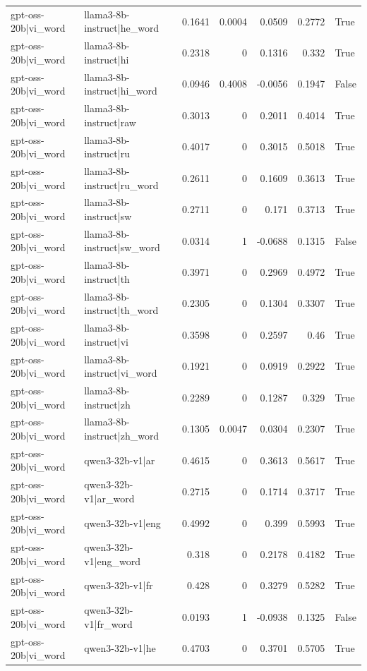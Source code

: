 \begin{table}
\begin{tabular}{l l r r r r l}
gpt-oss-20b|vi_word & llama3-8b-instruct|he_word & 0.1641 & 0.0004 & 0.0509 & 0.2772 & True \\
gpt-oss-20b|vi_word & llama3-8b-instruct|hi & 0.2318 & 0 & 0.1316 & 0.332 & True \\
gpt-oss-20b|vi_word & llama3-8b-instruct|hi_word & 0.0946 & 0.4008 & -0.0056 & 0.1947 & False \\
gpt-oss-20b|vi_word & llama3-8b-instruct|raw & 0.3013 & 0 & 0.2011 & 0.4014 & True \\
gpt-oss-20b|vi_word & llama3-8b-instruct|ru & 0.4017 & 0 & 0.3015 & 0.5018 & True \\
gpt-oss-20b|vi_word & llama3-8b-instruct|ru_word & 0.2611 & 0 & 0.1609 & 0.3613 & True \\
gpt-oss-20b|vi_word & llama3-8b-instruct|sw & 0.2711 & 0 & 0.171 & 0.3713 & True \\
gpt-oss-20b|vi_word & llama3-8b-instruct|sw_word & 0.0314 & 1 & -0.0688 & 0.1315 & False \\
gpt-oss-20b|vi_word & llama3-8b-instruct|th & 0.3971 & 0 & 0.2969 & 0.4972 & True \\
gpt-oss-20b|vi_word & llama3-8b-instruct|th_word & 0.2305 & 0 & 0.1304 & 0.3307 & True \\
gpt-oss-20b|vi_word & llama3-8b-instruct|vi & 0.3598 & 0 & 0.2597 & 0.46 & True \\
gpt-oss-20b|vi_word & llama3-8b-instruct|vi_word & 0.1921 & 0 & 0.0919 & 0.2922 & True \\
gpt-oss-20b|vi_word & llama3-8b-instruct|zh & 0.2289 & 0 & 0.1287 & 0.329 & True \\
gpt-oss-20b|vi_word & llama3-8b-instruct|zh_word & 0.1305 & 0.0047 & 0.0304 & 0.2307 & True \\
gpt-oss-20b|vi_word & qwen3-32b-v1|ar & 0.4615 & 0 & 0.3613 & 0.5617 & True \\
gpt-oss-20b|vi_word & qwen3-32b-v1|ar_word & 0.2715 & 0 & 0.1714 & 0.3717 & True \\
gpt-oss-20b|vi_word & qwen3-32b-v1|eng & 0.4992 & 0 & 0.399 & 0.5993 & True \\
gpt-oss-20b|vi_word & qwen3-32b-v1|eng_word & 0.318 & 0 & 0.2178 & 0.4182 & True \\
gpt-oss-20b|vi_word & qwen3-32b-v1|fr & 0.428 & 0 & 0.3279 & 0.5282 & True \\
gpt-oss-20b|vi_word & qwen3-32b-v1|fr_word & 0.0193 & 1 & -0.0938 & 0.1325 & False \\
gpt-oss-20b|vi_word & qwen3-32b-v1|he & 0.4703 & 0 & 0.3701 & 0.5705 & True \\

\end{tabular}
\end{table}
